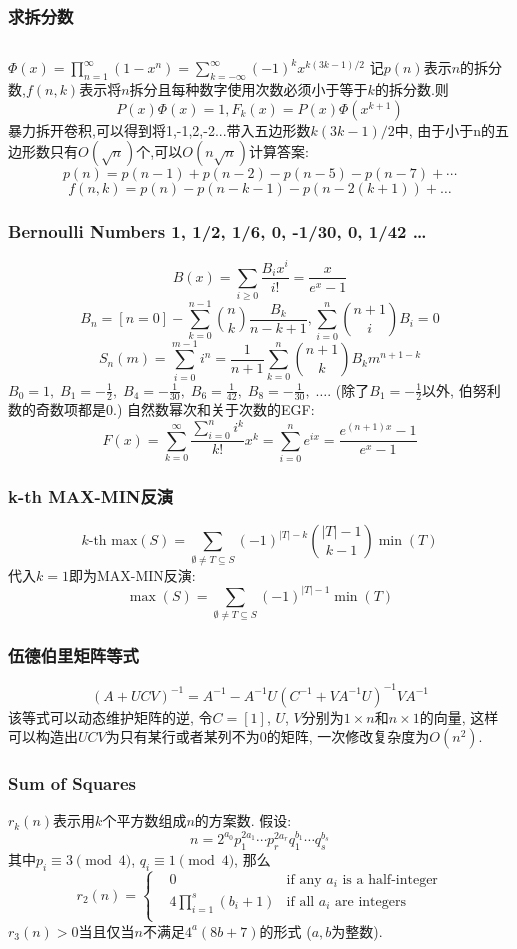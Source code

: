 \subsubsection{求拆分数}
\inputminted{python}{src/yzh/partition.py}
$ \Phi(x) = \prod_{n=1}^{\infty}(1-x^n) =\sum_{k=-\infty}^{\infty}{(-1)^kx^{k(3k-1)/2}} $
记$p(n)$表示$n$的拆分数,$f(n,k)$表示将$n$拆分且每种数字使用次数必须小于等于$k$的拆分数.则
\[ P(x)\Phi(x)=1, F_k(x) = P(x) \Phi(x^{k+1}) \]
暴力拆开卷积,可以得到将1,-1,2,-2...带入五边形数$k(3k-1)/2$中,
由于小于n的五边形数只有$O(\sqrt{n})$个,可以$O(n\sqrt{n})$计算答案:
\[ p(n) = p(n-1)+p(n-2)-p(n-5)-p(n-7)+\cdots \]
\[ f(n, k) = p(n)-p(n-k-1)-p(n-2(k+1))+ \dots \]

\subsubsection{Bernoulli Numbers 1, 1/2, 1/6, 0, -1/30, 0, 1/42 \dots}
\[ B(x)=\sum_{i\ge 0}\frac{B_i x^i}{i!}=\frac x{e^x-1} \]
\[ B_n=[n=0]-\sum_{k=0}^{n-1}\binom{n}{k}\frac{B_k}{n-k+1}, \sum_{i=0}^n\binom{n+1}{i}B_i=0 \]
\[ S_n(m)=\sum_{i=0}^{m-1}i^n=\frac{1}{n+1}\sum_{k=0}^n\binom{n+1}{k}B_k m^{n+1-k} \]
$ B_0 = 1,\; B_1 = -\frac 1 2,\; B_4 = -\frac 1 {30},\; B_6 = \frac 1 {42},\; B_8 = -\frac 1{30},\; \dots$.
(除了$B_1 = -\frac 1 2$以外, 伯努利数的奇数项都是$0$.)
自然数幂次和关于次数的EGF:
\[ F(x)=\sum_{k=0}^\infty \frac{\sum_{i=0}^n i^k}{k!}x^k =\sum_{i=0}^n e^{ix} =\frac{e^{(n+1)x}-1}{e^x-1} \]

\subsubsection{k-th MAX-MIN反演}
\[k\text{-th max}(S)=\sum_{\emptyset \neq T \subseteq S}(-1)^{|T|-k}\binom{|T|-1}{k-1}\min(T)\]
代入$k=1$即为MAX-MIN反演:
\[\max(S)=\sum_{\emptyset \neq T \subseteq S}(-1)^{|T|-1}\min(T)\]

\subsubsection{伍德伯里矩阵等式}
\[(A+UCV)^{-1}=A^{-1}-A^{-1}U(C^{-1}+VA^{-1}U)^{-1}VA^{-1}\]
该等式可以动态维护矩阵的逆, 令$C=[1]$, $U$, $V$分别为$1\times n$和$n\times 1$的向量, 这样可以构造出$UCV$为只有某行或者某列不为0的矩阵, 一次修改复杂度为$O(n^2)$.

\subsubsection{Sum of Squares}
$r_k(n)$表示用$k$个平方数组成$n$的方案数. 假设: 
\[n=2^{a_0}p_1^{2a_1}\cdots p_r^{2a_r}q_1^{b_1}\cdots q_s^{b_s}\]
其中$p_i\equiv 3 \pmod 4$, $q_i\equiv 1 \pmod 4$, 那么
\[r_2(n)=\left\{\begin{aligned}
& 0 & \text{if any }a_i\text{ is a half-integer}\\
& 4\prod_{i=1}^s(b_i+1) & \text{if all }a_i\text{ are integers}\\
\end{aligned}\right.\]
$r_3(n)>0$当且仅当$n$不满足$4^a(8b+7)$的形式 ($a,b$为整数).
